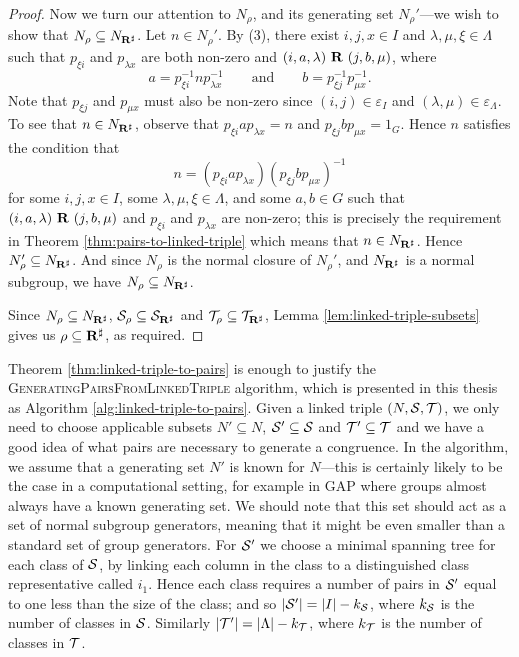 \begin{theorem}
\begin{proof}
    Now we turn our attention to $N_\rho$, and its generating set $N_\rho'$---we
    wish to show that $N_\rho \subseteq N_{\mathbf{R}^\sharp}$.  Let $n \in N_\rho'$.  By (3),
    there exist $i, j, x \in I$ and $\lambda, \mu, \xi \in \Lambda$ such that
    $p_{\xi i}$ and $p_{\lambda x}$ are both non-zero and
    $(i, a, \lambda) ~\mathbf{R}~ (j, b, \mu)$, where
    $$a = p_{\xi i}^{-1} n p_{\lambda x}^{-1} \qquad \text{and} \qquad
    b = p_{\xi j}^{-1} p_{\mu x}^{-1}.$$
    Note that $p_{\xi j}$ and $p_{\mu x}$
    must also be non-zero since $(i, j) \in \varepsilon_I$ and
    $(\lambda, \mu) \in \varepsilon_\Lambda$.  To see that $n \in N_{\mathbf{R}^\sharp}$, observe
    that $p_{\xi i} a p_{\lambda x} = n$ and $p_{\xi j} b p_{\mu x} = 1_G$.
    Hence $n$ satisfies the condition that
    $$n = (p_{\xi i} a p_{\lambda x}) (p_{\xi j} b p_{\mu x})^{-1}$$
    for some $i,j,x \in I$, some $\lambda, \mu, \xi \in \Lambda$, and some
    $a,b \in G$ such that $(i,a,\lambda) ~\mathbf{R}~ (j,b,\mu)$ and $p_{\xi i}$
    and $p_{\lambda x}$ are non-zero; this is precisely the requirement in
    Theorem \ref{thm:pairs-to-linked-triple} which means that $n \in N_{\mathbf{R}^\sharp}$.
    Hence $N_\rho' \subseteq N_{\mathbf{R}^\sharp}$.  And since $N_\rho$ is the normal closure of
    $N_\rho'$, and $N_{\mathbf{R}^\sharp}$ is a normal subgroup, we have $N_\rho \subseteq N_{\mathbf{R}^\sharp}$.

    Since $N_\rho \subseteq N_{\mathbf{R}^\sharp}$, $\mathcal{S}_\rho \subseteq \mathcal{S}_{\mathbf{R}^\sharp}$ and
    $\mathcal{T}_\rho \subseteq \mathcal{T}_{\mathbf{R}^\sharp}$, Lemma \ref{lem:linked-triple-subsets} gives us
    $\rho \subseteq \mathbf{R}^\sharp$, as required.
  \end{proof}
\end{theorem}

Theorem \ref{thm:linked-triple-to-pairs} is enough to justify the
\textsc{GeneratingPairsFromLinkedTriple} algorithm, which is presented in this
thesis as Algorithm \ref{alg:linked-triple-to-pairs}.  Given a linked triple
$(N, \mathcal{S}, \mathcal{T})$, we only need to choose applicable subsets $N' \subseteq N$,
$\mathcal{S}' \subseteq \mathcal{S}$ and $\mathcal{T}' \subseteq \mathcal{T}$ and we have a
good idea of what pairs are necessary to generate a congruence.  In the
algorithm, we assume that a generating set $N'$ is known for $N$---this is
certainly likely to be the case in a computational setting, for example in GAP
\cite{gap} where groups almost always have a known generating set.  We should
note that this set should act as a set of normal subgroup generators, meaning
that it might be even smaller than a standard set of group generators.  For
$\mathcal{S}'$ we choose a minimal spanning tree for each class of $\mathcal{S}$, by linking
each column in the class to a distinguished class representative called $i_1$.
Hence each class requires a number of pairs in $\mathcal{S}'$ equal to one less than the
size of the class; and so $|\mathcal{S}'| = |I| - k_{\mathcal{S}}$, where $k_{\mathcal{S}}$ is the number
of classes in $\mathcal{S}$.  Similarly $|\mathcal{T}'| = |\Lambda| - k_{\mathcal{T}}$, where $k_{\mathcal{T}}$ is
the number of classes in $\mathcal{T}$.

